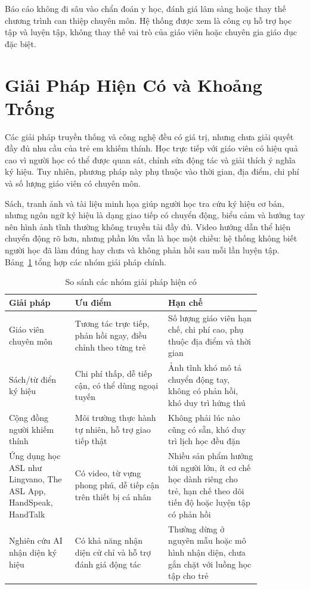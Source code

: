 \documentclass[conference]{IEEEtran}
\begin{document}
Báo cáo không đi sâu vào chẩn đoán y học, đánh giá lâm sàng hoặc thay thế chương trình can thiệp chuyên môn. Hệ thống được xem là công cụ hỗ trợ học tập và luyện tập, không thay thế vai trò của giáo viên hoặc chuyên gia giáo dục đặc biệt.

\section{Giải Pháp Hiện Có và Khoảng Trống}
Các giải pháp truyền thống và công nghệ đều có giá trị, nhưng chưa giải quyết đầy đủ nhu cầu của trẻ em khiếm thính. Học trực tiếp với giáo viên có hiệu quả cao vì người học có thể được quan sát, chỉnh sửa động tác và giải thích ý nghĩa ký hiệu. Tuy nhiên, phương pháp này phụ thuộc vào thời gian, địa điểm, chi phí và số lượng giáo viên có chuyên môn.

Sách, tranh ảnh và tài liệu minh họa giúp người học tra cứu ký hiệu cơ bản, nhưng ngôn ngữ ký hiệu là dạng giao tiếp có chuyển động, biểu cảm và hướng tay nên hình ảnh tĩnh thường không truyền tải đầy đủ. Video hướng dẫn thể hiện chuyển động rõ hơn, nhưng phần lớn vẫn là học một chiều: hệ thống không biết người học đã làm đúng hay chưa và không phản hồi sau mỗi lần luyện tập. Bảng~\ref{tab:solutions} tổng hợp các nhóm giải pháp chính.

\begin{table}[htbp]
\caption{So sánh các nhóm giải pháp hiện có}
\begin{center}
\footnotesize
\begin{tabular}{|p{0.22\linewidth}|p{0.31\linewidth}|p{0.31\linewidth}|}
\hline
\textbf{Giải pháp} & \textbf{Ưu điểm} & \textbf{Hạn chế} \\
\hline
Giáo viên chuyên môn & Tương tác trực tiếp, phản hồi ngay, điều chỉnh theo từng trẻ & Số lượng giáo viên hạn chế, chi phí cao, phụ thuộc địa điểm và thời gian \\
\hline
Sách/từ điển ký hiệu & Chi phí thấp, dễ tiếp cận, có thể dùng ngoại tuyến & Ảnh tĩnh khó mô tả chuyển động tay, không có phản hồi, khó duy trì hứng thú \\
\hline
Cộng đồng người khiếm thính & Môi trường thực hành tự nhiên, hỗ trợ giao tiếp thật & Không phải lúc nào cũng có sẵn, khó duy trì lịch học đều đặn \\
\hline
Ứng dụng học ASL như Lingvano, The ASL App, HandSpeak, HandTalk & Có video, từ vựng phong phú, dễ tiếp cận trên thiết bị cá nhân & Nhiều sản phẩm hướng tới người lớn, ít cơ chế học dành riêng cho trẻ, hạn chế theo dõi tiến độ hoặc luyện tập có phản hồi \\
\hline
Nghiên cứu AI nhận diện ký hiệu & Có khả năng nhận diện cử chỉ và hỗ trợ đánh giá động tác & Thường dừng ở nguyên mẫu hoặc mô hình nhận diện, chưa gắn chặt với luồng học tập cho trẻ \\
\hline
\end{tabular}
\label{tab:solutions}
\end{center}
\end{table}
\end{document}
